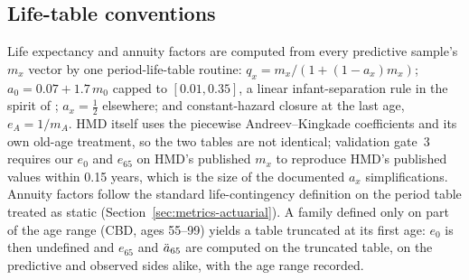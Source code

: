 \subsection{Life-table conventions}

Life expectancy and annuity factors are computed from every predictive
sample's $m_x$ vector by one period-life-table routine:
$q_x = m_x/(1+(1-a_x)m_x)$; $a_0 = 0.07+1.7\,m_0$ capped to $[0.01,0.35]$,
a linear infant-separation rule in the spirit of \citet{andreev2015average};
$a_x=\tfrac12$ elsewhere; and constant-hazard closure at the last age,
$e_A = 1/m_A$. HMD itself uses the piecewise Andreev--Kingkade coefficients
and its own old-age treatment, so the two tables are not identical;
validation gate~3 requires our $e_0$ and $e_{65}$ on HMD's published $m_x$
to reproduce HMD's published values within 0.15 years, which is the size of
the documented $a_x$ simplifications. Annuity factors follow the standard
life-contingency definition \citep{dickson2020actuarial} on the period table
treated as static (Section~\ref{sec:metrics-actuarial}). A family defined
only on part of the age range (CBD, ages 55--99) yields a table truncated at
its first age: $e_0$ is then undefined and $e_{65}$ and $\ddot{a}_{65}$ are
computed on the truncated table, on the predictive and observed sides
alike, with the age range recorded.
